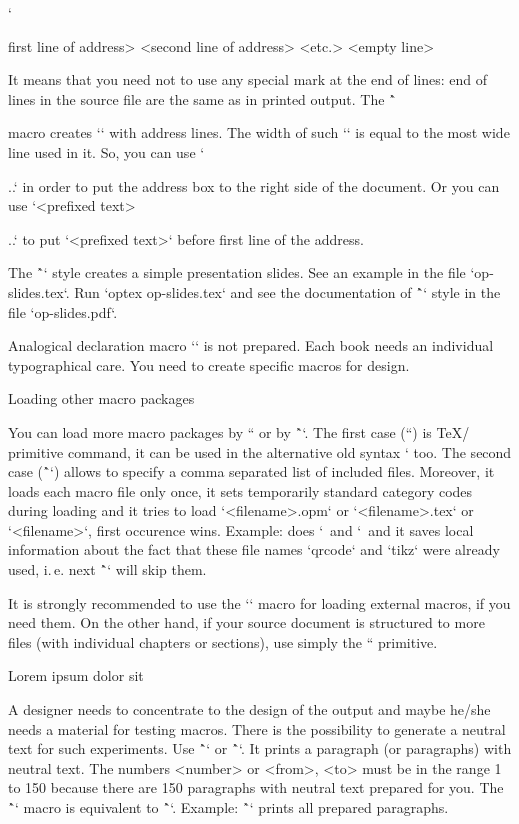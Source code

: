 {\begtt \catcode`
\address
  <first line of address>
  <second line of address>
  <etc.>
  <empty line>
\endtt

It means that you need not to use any special mark at the end of lines: end
of lines in the source file are the same as in printed output. The
\^`\address` macro creates `\vtop` with address lines. The width of such
`\vtop` is equal to the most wide line used in it. So, you can use
`\hfill\address...` in order to put the address box to the right side of the
document. Or you can use `<prefixed text>\address...` to put 
`<prefixed text>` before first line of the address.

The \^`\slides` style creates a simple presentation slides. See an example
in the file `op-slides.tex`. Run `optex op-slides.tex` and see the documentation of
\^`\slides` style in the file `op-slides.pdf`. 

Analogical declaration macro `\book` is not prepared. Each book needs an
individual typographical care. You need to create specific macros for
design. 

\secc Loading other macro packages

You can load more macro packages by `` or by
\^``. The first case (``) is \TeX/ primitive command, it can be
used in the alternative old syntax ` too. The
second case (\^`\load`) allows to specify a comma separated list of included files.
Moreover, it loads each macro file only once, it sets
temporarily standard category codes during loading and it tries to
load `<filename>.opm` or `<filename>.tex` or `<filename>`, first occurence
wins. Example: 
\begtt
{} 
\endtt
%
does ` \,and ` \,and it saves
local information about the fact that these file names
`qrcode` and `tikz` were already used, i.\,e. next \^`\load` will skip them.  

It is strongly recommended to use the `\load` macro for loading external
macros, if you need them. On the other hand, if your source document is structured
to more files (with individual chapters or sections), use simply the `` primitive.


\secc Lorem ipsum dolor sit

\new
A designer needs to concentrate to the design of the output and maybe he/she 
needs a material for testing macros. There is the possibility to generate a
neutral text for such experiments. Use \^`\lorem[<number>]` or
\^`\lorem[<from>-<to>]`. It prints a paragraph (or paragraphs) with neutral
text. The numbers <number> or <from>, <to> must be in the range 1 to 150
because there are 150 paragraphs with neutral text prepared for you.
The \^`\lipsum` macro is equivalent to \^`\lorem`. Example: \^`\lipsum[1-150]`
prints all prepared paragraphs.

}
